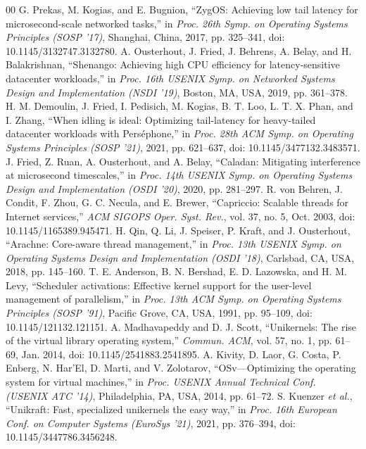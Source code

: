 \documentclass[conference]{IEEEtran}
\begin{document}
\begin{thebibliography}{00}
 G. Prekas, M. Kogias, and E. Bugnion, ``ZygOS: Achieving low tail latency for microsecond-scale networked tasks,'' in \textit{Proc. 26th Symp. on Operating Systems Principles (SOSP '17)}, Shanghai, China, 2017, pp. 325--341, doi: 10.1145/3132747.3132780.
 A. Ousterhout, J. Fried, J. Behrens, A. Belay, and H. Balakrishnan, ``Shenango: Achieving high CPU efficiency for latency-sensitive datacenter workloads,'' in \textit{Proc. 16th USENIX Symp. on Networked Systems Design and Implementation (NSDI '19)}, Boston, MA, USA, 2019, pp. 361--378.
 H. M. Demoulin, J. Fried, I. Pedisich, M. Kogias, B. T. Loo, L. T. X. Phan, and I. Zhang, ``When idling is ideal: Optimizing tail-latency for heavy-tailed datacenter workloads with Pers\'ephone,'' in \textit{Proc. 28th ACM Symp. on Operating Systems Principles (SOSP '21)}, 2021, pp. 621--637, doi: 10.1145/3477132.3483571.
 J. Fried, Z. Ruan, A. Ousterhout, and A. Belay, ``Caladan: Mitigating interference at microsecond timescales,'' in \textit{Proc. 14th USENIX Symp. on Operating Systems Design and Implementation (OSDI '20)}, 2020, pp. 281--297.
 R. von Behren, J. Condit, F. Zhou, G. C. Necula, and E. Brewer, ``Capriccio: Scalable threads for Internet services,'' \textit{ACM SIGOPS Oper. Syst. Rev.}, vol. 37, no. 5, Oct. 2003, doi: 10.1145/1165389.945471.
 H. Qin, Q. Li, J. Speiser, P. Kraft, and J. Ousterhout, ``Arachne: Core-aware thread management,'' in \textit{Proc. 13th USENIX Symp. on Operating Systems Design and Implementation (OSDI '18)}, Carlsbad, CA, USA, 2018, pp. 145--160.
 T. E. Anderson, B. N. Bershad, E. D. Lazowska, and H. M. Levy, ``Scheduler activations: Effective kernel support for the user-level management of parallelism,'' in \textit{Proc. 13th ACM Symp. on Operating Systems Principles (SOSP '91)}, Pacific Grove, CA, USA, 1991, pp. 95--109, doi: 10.1145/121132.121151.
 A. Madhavapeddy and D. J. Scott, ``Unikernels: The rise of the virtual library operating system,'' \textit{Commun. ACM}, vol. 57, no. 1, pp. 61--69, Jan. 2014, doi: 10.1145/2541883.2541895.
 A. Kivity, D. Laor, G. Costa, P. Enberg, N. Har'El, D. Marti, and V. Zolotarov, ``OSv---Optimizing the operating system for virtual machines,'' in \textit{Proc. USENIX Annual Technical Conf. (USENIX ATC '14)}, Philadelphia, PA, USA, 2014, pp. 61--72.
 S. Kuenzer \textit{et al.}, ``Unikraft: Fast, specialized unikernels the easy way,'' in \textit{Proc. 16th European Conf. on Computer Systems (EuroSys '21)}, 2021, pp. 376--394, doi: 10.1145/3447786.3456248.

\end{thebibliography}
\end{document}
